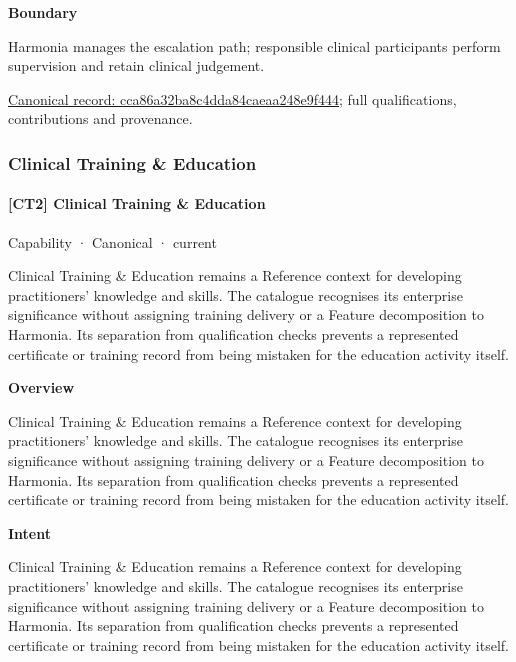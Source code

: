 \textbf{Boundary}



Harmonia manages the escalation path; responsible clinical participants perform supervision and retain clinical judgement.


{\footnotesize \href{../../../../continuum/strategy/capability/cca86a32ba8c4dda84caeaa248e9f444.md}{Canonical record: cca86a32ba8c4dda84caeaa248e9f444}; full qualifications, contributions and provenance.}\par
\subsubsection{Clinical Training \& Education}

\paragraph{[CT2] Clinical Training \& Education}

\label{element:d016f35ffbc345d99d7281e968c14ddb}
{\small Capability · Canonical · current}\par

Clinical Training \& Education remains a Reference context for developing practitioners' knowledge and skills. The catalogue recognises its enterprise significance without assigning training delivery or a Feature decomposition to Harmonia. Its separation from qualification checks prevents a represented certificate or training record from being mistaken for the education activity itself.



\textbf{Overview}



Clinical Training \& Education remains a Reference context for developing practitioners' knowledge and skills. The catalogue recognises its enterprise significance without assigning training delivery or a Feature decomposition to Harmonia. Its separation from qualification checks prevents a represented certificate or training record from being mistaken for the education activity itself.



\textbf{Intent}



Clinical Training \& Education remains a Reference context for developing practitioners' knowledge and skills. The catalogue recognises its enterprise significance without assigning training delivery or a Feature decomposition to Harmonia. Its separation from qualification checks prevents a represented certificate or training record from being mistaken for the education activity itself.



